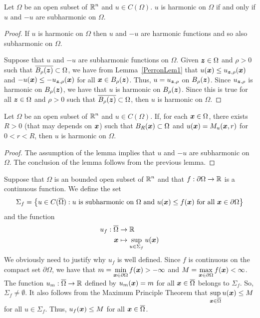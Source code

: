 \begin{lemma}
Let $\Omega$ be an open subset of $\displaystyle \mathbb{R}^n$ and $u \in C(\Omega)$.
$u$ is harmonic on $\Omega$ if and only if $u$ and $-u$ are
subharmonic on $\Omega$.
\end{lemma}

\begin{proof}
\stage{$\mathbf{\Rightarrow}$}
If $u$ is harmonic on $\Omega$ then $u$ and $-u$ are harmonic functions
and so also subharmonic on $\Omega$.

\stage{$\mathbf{\Leftarrow}$}
Suppose that $u$ and $-u$ are subharmonic functions on $\Omega$.
Given ${\bm{z}} \in \Omega$ and $\rho >0$ such that
$\overline{B_{\rho}({\bm{z}})} \subset \Omega$, we have from
Lemma~\ref{PerronLem1} that
$u({\bm{x}}) \leq u_{{\bm{z}},\rho}({\bm{x}})$ and
$-u({\bm{x}}) \leq -u_{{\bm{z}},\rho}({\bm{x}})$ for all
${\bm{x}} \in B_{\rho}({\bm{z}})$.  Thus,
$u = u_{{\bm{z}},\rho}$ on $B_{\rho}({\bm{z}})$.  Since 
$u_{{\bm{z}},\rho}$ is harmonic on $B_{\rho}({\bm{z}})$, we have that
$u$ is harmonic on $B_{\rho}({\bm{z}})$.  Since this is true for all
${\bm{z}} \in \Omega$ and $\rho>0$ such that
$\overline{B_{\rho}({\bm{z}})} \subset \Omega$, then $u$ is harmonic on
$\Omega$.
\end{proof}

\begin{lemma}
Let $\Omega$ be an open subset of $\displaystyle \mathbb{R}^n$ and $u \in C(\Omega)$.
If, for each ${\bm{x}} \in \Omega$, there exists $R>0$ (that may depends
on ${\bm{x}}$) such that $B_R({\bm{x}}) \subset \Omega$ and
$u({\bm{x}}) = M_u({\bm{x}},r)$ for $0 < r < R$, then
$u$ is harmonic on $\Omega$.
\end{lemma}

\begin{proof}
The assumption of the lemma implies that $u$ and $-u$ are subharmonic
on $\Omega$.  The conclusion of the lemma follows from the previous
lemma.
\end{proof}

Suppose that $\Omega$ is an bounded open subset of $\displaystyle \mathbb{R}^n$
and that $\displaystyle f: \partial \Omega \to \mathbb{R}$ is a continuous
function.  We define the set
\[
\Sigma_f = \left\{ u \in C(\overline{\Omega}) :
u \ \text{is subharmonic on} \ \Omega \ \text{and} \ u({\bm{x}}) \leq f({\bm{x}})
\ \text{for all} \ {\bm{x}} \in \partial \Omega \right \}
\]
and the function
\begin{align*}
u_f : \overline{\Omega} &\to \mathbb{R} \\
{\bm{x}} &\mapsto \sup_{u \in \Sigma_f} u({\bm{x}})
\end{align*}
We obviously need to justify why $u_f$ is well defined.
Since $f$ is continuous on the compact set $\partial \Omega$, we have
that
$\displaystyle m = \min_{{\bm{x}} \in \partial \Omega} f({\bm{x}})
> -\infty$ and
$\displaystyle M = \max_{{\bm{x}} \in \partial \Omega} f({\bm{x}})
< \infty$.  The function $u_m:\overline{\Omega} \to \mathbb{R}$ defined by
$u_m({\bm{x}}) = m$ for all ${\bm{x}} \in \overline{\Omega}$ belongs to
$\Sigma_f$.  So, $\Sigma_f \neq \emptyset$.  It also follows from the
Maximum Principle Theorem that
$\displaystyle \sup_{{\bm{x}} \in \overline{\Omega}} u({\bm{x}}) \leq M$
for all $u \in \Sigma_f$.
Thus, $u_f({\bm{x}}) \leq M$ for all ${\bm{x}} \in \overline{\Omega}$.

